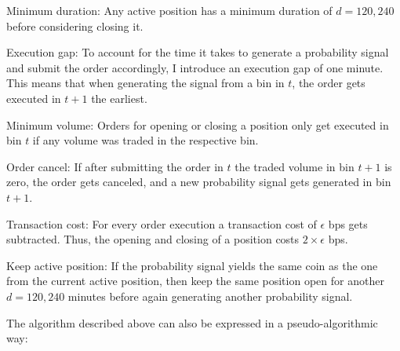 \begin{basedescript}{%
    \desclabelstyle{\multilinelabel}
    }
    \item[Minimum duration:] {
        Any active position has a minimum duration of $ d = 120, 240 $ before considering closing it.
    }
    \item[Execution gap:] {
        To account for the time it takes to generate a probability signal and submit the order accordingly,
        I introduce an execution gap of one minute. This means that when generating the signal from a bin in $ t $,
        the order gets executed in $ t + 1 $ the earliest.
    }
    \item[Minimum volume:] { 
        Orders for opening or closing a position only get executed in bin $ t $
        if any volume was traded in the respective bin.
    }
    \item[Order cancel:] {
        If after submitting the order in $ t $ the traded volume in bin $ t + 1 $
        is zero, the order gets canceled, and a new probability signal gets generated in bin $ t + 1 $.
    }
    \item[Transaction cost:] {
        For every order execution a transaction cost of $ \epsilon $ bps gets subtracted. 
        Thus, the opening and closing of a position costs $ 2 \times \epsilon $ bps.
    }
    \item[Keep active position:] {
        If the probability signal yields the same coin as the one from the current active position,
        then keep the same position open for another $ d=120, 240 $ minutes before again generating another
        probability signal.
    }
\end{basedescript}


The algorithm described above can also be expressed in a pseudo-algorithmic way:

